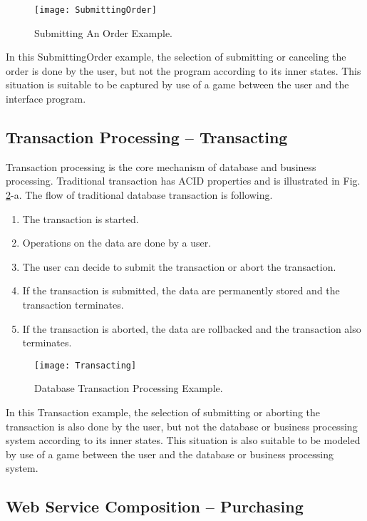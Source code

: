 \documentclass{fac}
\begin{document}
\begin{figure}
  \centering
\texttt{[image: SubmittingOrder]}
  \caption{Submitting An Order Example.}
  \label{SubmittingOrder}
\end{figure}

In this SubmittingOrder example, the selection of submitting or canceling the order is done by the user, but not the program according to its inner states. This situation is suitable to be captured by use of a game between the user and the interface program.

\subsection{Transaction Processing -- Transacting}

Transaction processing is the core mechanism of database and business processing. Traditional transaction has ACID properties and is illustrated in Fig. \ref{Transaction}-a. The flow of traditional database transaction is following.

\begin{enumerate}
  \item The transaction is started.
  \item Operations on the data are done by a user.
  \item The user can decide to submit the transaction or abort the transaction.
  \item If the transaction is submitted, the data are permanently stored and the transaction terminates.
  \item If the transaction is aborted, the data are rollbacked and the transaction also terminates.
\end{enumerate}

\begin{figure}
  \centering
\texttt{[image: Transacting]}
  \caption{Database Transaction Processing Example.}
  \label{Transaction}
\end{figure}

In this Transaction example, the selection of submitting or aborting the transaction is also done by the user, but not the database or business processing system according to its inner states. This situation is also suitable to be modeled by use of a game between the user and the database or business processing system.

\subsection{Web Service Composition -- Purchasing}
\end{document}

